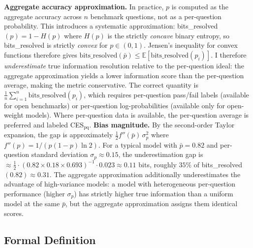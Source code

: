 \documentclass[12pt]{article}
\begin{document}
\noindent\textbf{Aggregate accuracy approximation.} In practice, $p$ is computed as the aggregate accuracy across $n$ benchmark questions, not as a per-question probability. This introduces a systematic approximation: bits\_resolved$(p) = 1 - H(p)$ where $H(p)$ is the strictly \textit{concave} binary entropy, so bits\_resolved is strictly \textit{convex} for $p \in (0,1)$. Jensen's inequality for convex functions therefore gives $\text{bits\_resolved}(\bar{p}) \leq \mathbb{E}[\text{bits\_resolved}(p_i)]$. I therefore \textit{underestimate} true information resolution relative to the per-question ideal: the aggregate approximation yields a lower information score than the per-question average, making the metric conservative. The correct quantity is $\frac{1}{n}\sum_{i=1}^n \text{bits\_resolved}(p_i)$, which requires per-question pass/fail labels (available for open benchmarks) or per-question log-probabilities (available only for open-weight models). Where per-question data is available, the per-question average is preferred and labeled CES$_{\text{pq}}$. \textbf{Bias magnitude.} By the second-order Taylor expansion, the gap is approximately $\frac{1}{2} f''(\bar{p})\,\sigma_p^2$ where $f''(p) = 1/(p(1-p)\ln 2)$. For a typical model with $\bar{p} = 0.82$ and per-question standard deviation $\sigma_p \approx 0.15$, the underestimation gap is $\approx \tfrac{1}{2} \cdot (0.82 \times 0.18 \times 0.693)^{-1} \cdot 0.023 \approx 0.11$ bits, roughly $35\%$ of bits\_resolved$(0.82) \approx 0.31$. The aggregate approximation additionally underestimates the advantage of high-variance models: a model with heterogeneous per-question performance (higher $\sigma_p$) has strictly higher true information than a uniform model at the same $\bar{p}$, but the aggregate approximation assigns them identical scores.

\subsection{Formal Definition}
\end{document}

